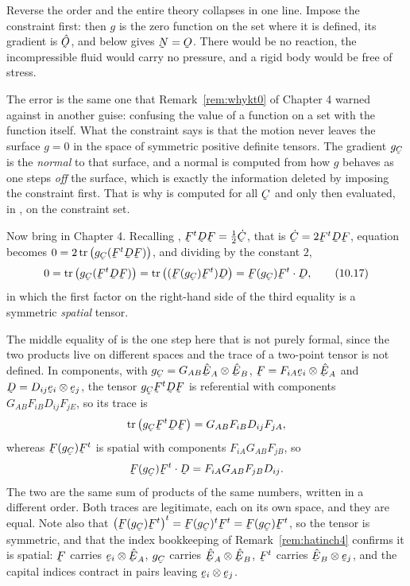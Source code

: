 \begin{remark}\label{rem:ch10apost}
Reverse the order and the entire theory collapses in one line. Impose the
constraint first: then $g$ is the zero function on the set where it is
defined, its gradient is $\hOb$, and  below gives $\bN=\Ob$.
There would be no reaction, the incompressible fluid would carry no
pressure, and a rigid body would be free of stress.

The error is the same one that Remark~\ref{rem:whykt0} of Chapter 4
warned against in another guise: confusing the value of a function on a
set with the function itself. What the constraint says is that the motion
never leaves the surface $g=0$ in the space of symmetric positive
definite tensors. The gradient $g_{\bC}$ is the \emph{normal} to that
surface, and a normal is computed from how $g$ behaves as one steps
\emph{off} the surface, which is exactly the information deleted by
imposing the constraint first. That is why  is computed for
all $\bC$ and only then evaluated, in , on the constraint set.
\end{remark}

Now bring in Chapter 4. Recalling , $\bF^{t}\bD\bF=\tfrac12
\dot\bC$, that is $\dot\bC=2\bF^{t}\bD\bF$, equation  becomes
$0=2\tr\big(g_{\bC}(\bF^{t}\bD\bF)\big)$, and dividing by the constant
$2$,
\begin{equation}
   0=\tr\big(g_{\bC}(\bF^{t}\bD\bF)\big)
    =\tr\big((\bF(g_{\bC})\bF^{t})\bD\big)
    =\bF(g_{\bC})\bF^{t}\cdot\bD ,
   \tag{10.17}\label{eq:10.17}
\end{equation}
in which the first factor on the right-hand side of the third equality is
a symmetric \emph{spatial} tensor.

The middle equality of  is the one step here that is not
purely formal, since the two products live on different spaces and the
trace of a two-point tensor is not defined. In components, with
$g_{\bC}=G_{AB}\hbE_{A}\otimes\hbE_{B}$, $\bF=F_{iA}\be_{i}
\otimes\hbE_{A}$ and $\bD=D_{ij}\be_{i}\otimes\be_{j}$, the tensor
$g_{\bC}\bF^{t}\bD\bF$ is referential with components
$G_{AB}F_{iB}D_{ij}F_{jE}$, so its trace is
\[
   \tr\big(g_{\bC}\bF^{t}\bD\bF\big)=G_{AB}F_{iB}D_{ij}F_{jA},
\]
whereas $\bF(g_{\bC})\bF^{t}$ is spatial with components
$F_{iA}G_{AB}F_{jB}$, so
\[
   \bF(g_{\bC})\bF^{t}\cdot\bD=F_{iA}G_{AB}F_{jB}D_{ij}.
\]
The two are the same sum of products of the same numbers, written in a
different order. Both traces are legitimate, each on its own space, and
they are equal. Note also that
$\big(\bF(g_{\bC})\bF^{t}\big)^{t}=\bF(g_{\bC})^{t}\bF^{t}
=\bF(g_{\bC})\bF^{t}$, so the tensor is symmetric, and that the index
bookkeeping of Remark~\ref{rem:hatinch4} confirms it is spatial: $\bF$
carries $\be_{i}\otimes\hbE_{A}$, $g_{\bC}$ carries
$\hbE_{A}\otimes\hbE_{B}$, $\bF^{t}$ carries $\hbE_{B}\otimes\be_{j}$,
and the capital indices contract in pairs leaving
$\be_{i}\otimes\be_{j}$.

